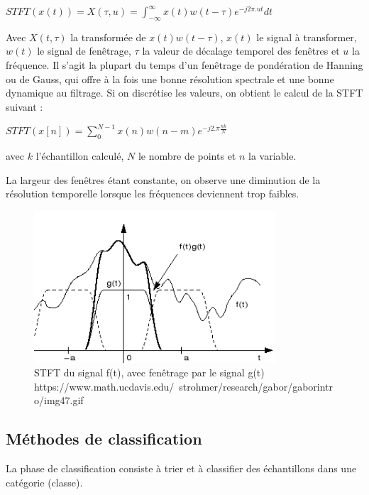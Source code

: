  \begin{center}
 $
 STFT(x(t)) = X(\tau,u) = \int_{-\infty}^{\infty}x(t)w(t-\tau)e^{-j2\pi.ut}dt
 $
\end{center}

Avec $X(t,\tau)$ la transformée de $x(t)w(t-\tau)$, $x(t)$ le signal à transformer, $w(t)$ le signal de fenêtrage, $\tau$ la valeur de décalage temporel des fenêtres et $u$ la fréquence. Il s'agit la plupart du temps d'un fenêtrage de pondération de Hanning ou de Gauss, qui offre à la fois une bonne résolution spectrale et une bonne dynamique au filtrage. 
Si on discrétise les valeurs, on obtient le calcul de la STFT suivant : 

 \begin{center}
$
 STFT(x[n])=\sum_{0}^{N-1}x(n)w(n-m)e^{-j2.\pi\frac{nk}{N}}
 $
 \end{center}
 
 avec $k$ l'échantillon calculé, $N$ le nombre de points et $n$ la variable.
 
 La largeur des fenêtres étant constante, on observe une diminution de la résolution temporelle lorsque les fréquences deviennent trop faibles.

\begin{figure}[h]
	\centering\includegraphics[width=9cm]{images/STFT.png}
	\caption[STFT du signal f(t), avec fenêtrage par le signal g(t)]{STFT du signal f(t), avec fenêtrage par le signal g(t)\\https://www.math.ucdavis.edu/~strohmer/research/gabor/gaborintro/img47.gif}
	\label{stft}
\end{figure}

\subsection{Méthodes de classification}
\label{subsection : 4.Méthodes de classification}
La phase de classification consiste à trier et à classifier des échantillons dans une catégorie (classe). 

